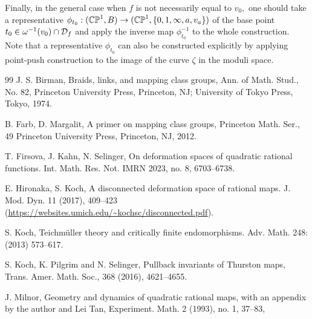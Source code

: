 \documentclass{article}
\begin{document}
Finally, in the general case when $f$ is not necessarily equal to $v_0,$ one should take a representative $\phi_{t_0}:(\mathbb{CP}^1,B)\to (\mathbb{CP}^1, \{0,1,\infty,a,v_a\})$ of the base point $t_0\in \omega^{-1}(v_0)\cap\mathcal{D}_f$ and apply the inverse map $\phi_{t_0}^{-1}$ to the whole construction. Note that a representative $\phi_{t_0}$ can also be constructed explicitly by applying point-push construction to the image of the curve $\zeta$ in the moduli space.


\begin{thebibliography}{99}
 J. S. Birman, Braids, links, and mapping class groups, Ann. of Math. Stud., No. 82, Princeton University Press, Princeton, NJ; University of Tokyo Press, Tokyo, 1974.

 B. Farb, D. Margalit, A primer on mapping class groups, Princeton Math. Ser., 49 Princeton University Press, Princeton, NJ, 2012.

 T. Firsova, J. Kahn, N. Selinger, 
On deformation spaces of quadratic rational functions.
Int. Math. Res. Not. IMRN 2023, no. 8, 6703--6738.

 E. Hironaka, S. Koch, A disconnected deformation space of rational maps. J. Mod. Dyn. 11 (2017), 409--423 (\url{https://websites.umich.edu/~kochsc/disconnected.pdf}).


 S. Koch, Teichm\"uller theory and critically finite endomorphisms. Adv. Math. 248: (2013) 573–617.

 S. Koch, K. Pilgrim and N. Selinger, Pullback invariants of Thurston maps, Trans. Amer.
Math. Soc., 368 (2016), 4621–4655.

 J. Milnor,  Geometry and dynamics of quadratic rational maps, with an appendix by the author and Lei Tan, Experiment. Math. 2 (1993), no. 1, 37–83,

\end{thebibliography}
\end{document}
